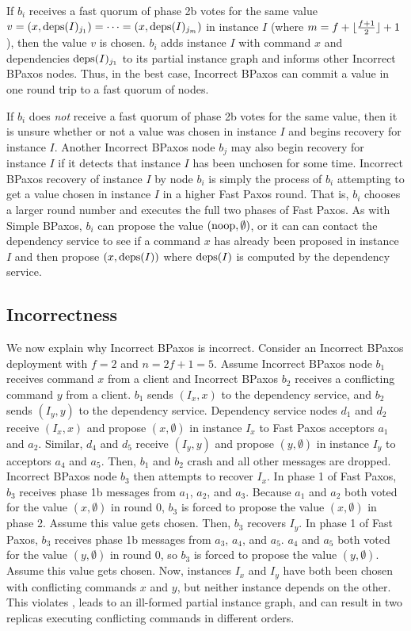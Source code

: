 If $b_i$ receives a fast quorum of phase 2b votes for the same value $v = (x,
\text{deps}(I)_{j_1}) = \cdots = (x, \text{deps}(I)_{j_m})$ in instance $I$ (where $m =
f + \lfloor\frac{f + 1}{2}\rfloor + 1$), then the value $v$ is chosen. $b_i$ adds instance $I$ with
command $x$ and dependencies $\text{deps}(I)_{j_1}$ to its partial instance graph and
informs other Incorrect BPaxos nodes. Thus, in the best case, Incorrect BPaxos
can commit a value in one round trip to a fast quorum of nodes.

If $b_i$ does \emph{not} receive a fast quorum of phase 2b votes for the same
value, then it is unsure whether or not a value was chosen in instance $I$ and
begins recovery for instance $I$. Another Incorrect BPaxos node $b_j$ may also
begin recovery for instance $I$ if it detects that instance $I$ has been
unchosen for some time.
%
Incorrect BPaxos recovery of instance $I$ by node $b_i$ is simply the process
of $b_i$ attempting to get a value chosen in instance $I$ in a higher Fast
Paxos round. That is, $b_i$ chooses a larger round number and executes the full
two phases of Fast Paxos. As with Simple BPaxos, $b_i$ can propose the value
$(\text{noop}, \emptyset)$, or it can can contact the dependency service to see if a
command $x$ has already been proposed in instance $I$ and then propose $(x,
\text{deps}(I))$ where $\text{deps}(I)$ is computed by the dependency service.

\subsection{Incorrectness}
We now explain why Incorrect BPaxos is incorrect. Consider an Incorrect BPaxos
deployment with $f = 2$ and $n = 2f + 1 = 5$.
%
Assume Incorrect BPaxos node $b_1$ receives command $x$ from a client and
Incorrect BPaxos $b_2$ receives a conflicting command $y$ from a client. $b_1$
sends $(I_x, x)$ to the dependency service, and $b_2$ sends $(I_y, y)$ to the
dependency service. Dependency service nodes $d_1$ and $d_2$ receive $(I_x, x)$
and propose $(x, \emptyset)$ in instance $I_x$ to Fast Paxos acceptors $a_1$
and $a_2$. Similar, $d_4$ and $d_5$ receive $(I_y, y)$ and propose $(y,
\emptyset)$ in instance $I_y$ to acceptors $a_4$ and $a_5$. Then, $b_1$ and
$b_2$ crash and all other messages are dropped. Incorrect BPaxos node $b_3$
then attempts to recover $I_x$. In phase 1 of Fast Paxos, $b_3$ receives phase
1b messages from $a_1$, $a_2$, and $a_3$. Because $a_1$ and $a_2$ both voted
for the value $(x, \emptyset{})$ in round $0$, $b_3$ is forced to propose the
value $(x, \emptyset)$ in phase 2. Assume this value gets chosen.  Then, $b_3$
recovers $I_y$. In phase 1 of Fast Paxos, $b_3$ receives phase 1b messages from
$a_3$, $a_4$, and $a_5$. $a_4$ and $a_5$ both voted for the value $(y,
\emptyset{})$ in round $0$, so $b_3$ is forced to propose the value $(y,
\emptyset)$. Assume this value gets chosen. Now, instances $I_x$ and $I_y$ have
both been chosen with conflicting commands $x$ and $y$, but neither instance
depends on the other. This violates , leads to an
ill-formed partial instance graph, and can result in two replicas executing
conflicting commands in different orders.

